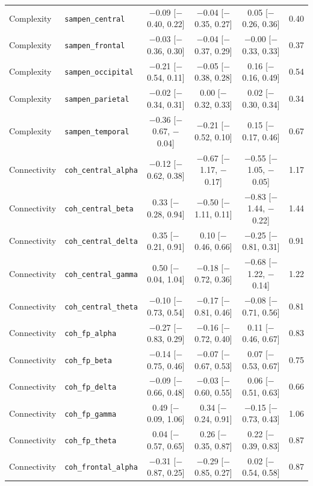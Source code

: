 {\begin{longtable}{llcccc}
Complexity & \texttt{sampen\_central} & $-$0.09 [$-$0.40, 0.22] & $-$0.04 [$-$0.35, 0.27] & 0.05 [$-$0.26, 0.36] & 0.40 \\
Complexity & \texttt{sampen\_frontal} & $-$0.03 [$-$0.36, 0.30] & $-$0.04 [$-$0.37, 0.29] & $-$0.00 [$-$0.33, 0.33] & 0.37 \\
Complexity & \texttt{sampen\_occipital} & $-$0.21 [$-$0.54, 0.11] & $-$0.05 [$-$0.38, 0.28] & 0.16 [$-$0.16, 0.49] & 0.54 \\
Complexity & \texttt{sampen\_parietal} & $-$0.02 [$-$0.34, 0.31] & 0.00 [$-$0.32, 0.33] & 0.02 [$-$0.30, 0.34] & 0.34 \\
Complexity & \texttt{sampen\_temporal} & $-$0.36 [$-$0.67, $-$0.04] & $-$0.21 [$-$0.52, 0.10] & 0.15 [$-$0.17, 0.46] & 0.67 \\
Connectivity & \texttt{coh\_central\_alpha} & $-$0.12 [$-$0.62, 0.38] & $-$0.67 [$-$1.17, $-$0.17] & $-$0.55 [$-$1.05, $-$0.05] & 1.17 \\
Connectivity & \texttt{coh\_central\_beta} & 0.33 [$-$0.28, 0.94] & $-$0.50 [$-$1.11, 0.11] & $-$0.83 [$-$1.44, $-$0.22] & 1.44 \\
Connectivity & \texttt{coh\_central\_delta} & 0.35 [$-$0.21, 0.91] & 0.10 [$-$0.46, 0.66] & $-$0.25 [$-$0.81, 0.31] & 0.91 \\
Connectivity & \texttt{coh\_central\_gamma} & 0.50 [$-$0.04, 1.04] & $-$0.18 [$-$0.72, 0.36] & $-$0.68 [$-$1.22, $-$0.14] & 1.22 \\
Connectivity & \texttt{coh\_central\_theta} & $-$0.10 [$-$0.73, 0.54] & $-$0.17 [$-$0.81, 0.46] & $-$0.08 [$-$0.71, 0.56] & 0.81 \\
Connectivity & \texttt{coh\_fp\_alpha} & $-$0.27 [$-$0.83, 0.29] & $-$0.16 [$-$0.72, 0.40] & 0.11 [$-$0.46, 0.67] & 0.83 \\
Connectivity & \texttt{coh\_fp\_beta} & $-$0.14 [$-$0.75, 0.46] & $-$0.07 [$-$0.67, 0.53] & 0.07 [$-$0.53, 0.67] & 0.75 \\
Connectivity & \texttt{coh\_fp\_delta} & $-$0.09 [$-$0.66, 0.48] & $-$0.03 [$-$0.60, 0.55] & 0.06 [$-$0.51, 0.63] & 0.66 \\
Connectivity & \texttt{coh\_fp\_gamma} & 0.49 [$-$0.09, 1.06] & 0.34 [$-$0.24, 0.91] & $-$0.15 [$-$0.73, 0.43] & 1.06 \\
Connectivity & \texttt{coh\_fp\_theta} & 0.04 [$-$0.57, 0.65] & 0.26 [$-$0.35, 0.87] & 0.22 [$-$0.39, 0.83] & 0.87 \\
Connectivity & \texttt{coh\_frontal\_alpha} & $-$0.31 [$-$0.87, 0.25] & $-$0.29 [$-$0.85, 0.27] & 0.02 [$-$0.54, 0.58] & 0.87 \\

\end{longtable}}
